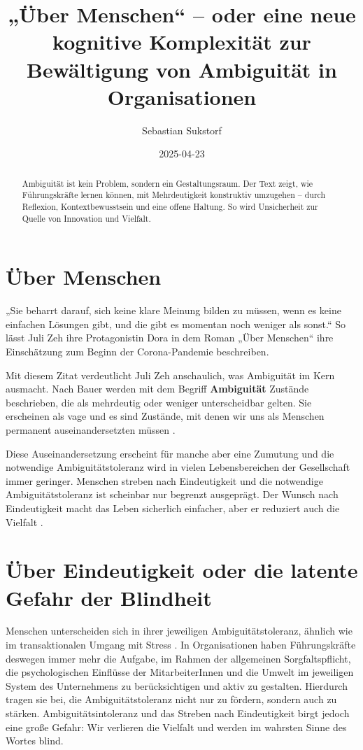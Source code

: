 \documentclass[
  ngerman,
  letterpaper,
  DIV=11]{scrartcl}
\title{„Über Menschen`` -- oder eine neue kognitive Komplexität zur
Bewältigung von Ambiguität in Organisationen}
\author{Sebastian Sukstorf}
\date{2025-04-23}
\renewcommand*\contentsname{Inhaltsverzeichnis}
\newcommand\contentsname{Inhaltsverzeichnis}
\begin{document}
\maketitle
\begin{abstract}
Ambiguität ist kein Problem, sondern ein Gestaltungsraum. Der Text
zeigt, wie Führungskräfte lernen können, mit Mehrdeutigkeit konstruktiv
umzugehen -- durch Reflexion, Kontextbewusstsein und eine offene
Haltung. So wird Unsicherheit zur Quelle von Innovation und Vielfalt.
\end{abstract}

\renewcommand*\contentsname{Inhaltsverzeichnis}
{
\hypersetup{linkcolor=}
\setcounter{tocdepth}{3}
\tableofcontents
}

\section{Über Menschen}\label{uxfcber-menschen}

„Sie beharrt darauf, sich keine klare Meinung bilden zu müssen, wenn es
keine einfachen Lösungen gibt, und die gibt es momentan noch weniger als
sonst.`` \autocite[28]{zeh2022} So lässt Juli Zeh ihre Protagonistin
Dora in dem Roman „Über Menschen`` ihre Einschätzung zum Beginn der
Corona-Pandemie beschreiben.

Mit diesem Zitat verdeutlicht Juli Zeh anschaulich, was Ambiguität im
Kern ausmacht. Nach Bauer werden mit dem Begriff \textbf{Ambiguität}
Zustände beschrieben, die als mehrdeutig oder weniger unterscheidbar
gelten. Sie erscheinen als vage und es sind Zustände, mit denen wir uns
als Menschen permanent auseinandersetzten müssen \autocite{bauer2018}.

Diese Auseinandersetzung erscheint für manche aber eine Zumutung und die
notwendige Ambiguitätstoleranz wird in vielen Lebensbereichen der
Gesellschaft immer geringer. Menschen streben nach Eindeutigkeit und die
notwendige Ambiguitätstoleranz ist scheinbar nur begrenzt ausgeprägt.
Der Wunsch nach Eindeutigkeit macht das Leben sicherlich einfacher, aber
er reduziert auch die Vielfalt \autocite{bauer2018}.

\section{Über Eindeutigkeit oder die latente Gefahr der
Blindheit}\label{uxfcber-eindeutigkeit-oder-die-latente-gefahr-der-blindheit}

Menschen unterscheiden sich in ihrer jeweiligen Ambiguitätstoleranz,
ähnlich wie im transaktionalen Umgang mit Stress \autocite{lazarus1984}.
In Organisationen haben Führungskräfte deswegen immer mehr die Aufgabe,
im Rahmen der allgemeinen Sorgfaltspflicht, die psychologischen
Einflüsse der MitarbeiterInnen und die Umwelt im jeweiligen System des
Unternehmens zu berücksichtigen und aktiv zu gestalten. Hierdurch tragen
sie bei, die Ambiguitätstoleranz nicht nur zu fördern, sondern auch zu
stärken. Ambiguitätsintoleranz und das Streben nach Eindeutigkeit birgt
jedoch eine große Gefahr: Wir verlieren die Vielfalt und werden im
wahrsten Sinne des Wortes blind.
\end{document}
